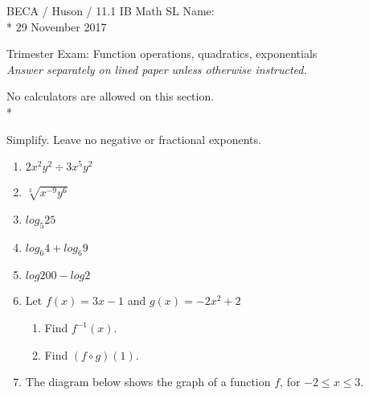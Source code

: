 \documentclass[]{book}
\begin{document}
\noindent BECA / Huson / 11.1 IB Math SL \hspace{2in} Name:\\*
29 November 2017
\begin{center}
{\Large Trimester Exam: Function operations, quadratics, exponentials}\\
\textit{Answer separately on lined paper unless otherwise instructed.}
\end{center}

No calculators are allowed on this section.\\*

Simplify. Leave no negative or fractional exponents.

\begin{enumerate}

\item $2x^{2}y^2 \div 3x^5 y^{2}$
\item $\sqrt[3]{x^{-9} y^{6}}$
\item $log_5 25$
\item $log_6 4 + log_6 9$
\item $log 200 - log 2$


\item Let $f(x)=3x-1$ and $g(x)=-2x^2+2$
\begin{enumerate}
    \item Find $f^{-1}(x)$.
    \item Find $(f \circ g)(1)$.
\end{enumerate}

\item The diagram below shows the graph of a function $f$, for $-2 \leq x \leq 3$.

\begin{figure}[!htbp]
\begin{center}
\end{center}
\end{figure}
\end{enumerate}
\end{document}
